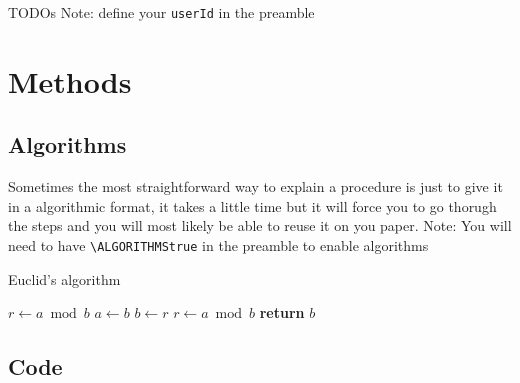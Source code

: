 \documentclass{project-logbook}
\begin{document}
{\begin{tipt}{TODOs}
Note: define your \texttt{userId} in the preamble
\end{tipt}





\newpage
\section{Methods} %
\label{sec:methods}

\subsection{Algorithms} %
\label{sub:algorithms}

\begin{tip}
Sometimes the most straightforward way to explain a procedure is just to give it in a algorithmic format, it takes a little time but it will force you to go thorugh the steps and you will most likely be able to reuse it on you paper.
Note: You will need to have \texttt{\textbackslash ALGORITHMStrue} in the preamble to enable algorithms
\end{tip}

\begin{algorithm}
\caption{Euclid’s algorithm}\label{alg:euclid}
\begin{algorithmic}[1]
\State $r\gets a\bmod b$
\State $a\gets b$
\State $b\gets r$
\State $r\gets a\bmod b$
\EndWhile\label{euclidendwhile}
\State \textbf{return} $b$
\EndProcedure
\end{algorithmic}
\end{algorithm}



\subsection{Code} %
\label{sub:code}

}
\end{document}
